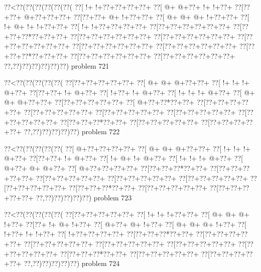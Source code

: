 \vbox{\vbox{\goo
\0??<\0??(\0??(\0??(\0??(\0??(\0??(
\0??[\- !+\- !+\0??+\0??+\0??+\0??+
\0??[\- @+\- @+\0??+\- !+\- !+\0??+
\0??[\0??+\0??+\- @+\0??+\0??+\0??+
\0??[\0??+\0??+\- @+\- !+\0??+\0??+
\0??[\- @+\- @+\- @+\- !+\0??+\0??+
\0??[\- !+\- @+\- !+\- !+\0??+\0??+
\0??[\- !+\- !+\0??+\0??+\0??+\0??+
\0??[\0??+\0??+\0??+\0??+\0??+\0??+
\0??[\0??+\0??+\0??*\0??+\0??+\0??+
\0??[\0??+\0??+\0??+\0??+\0??+\0??+
\0??[\0??+\0??+\0??+\0??+\0??+\0??+
\0??[\0??+\0??+\0??+\0??+\0??+\0??+
\0??[\0??+\0??+\0??+\0??+\0??+\0??+
\0??[\0??+\0??+\0??+\0??+\0??+\0??+
\0??[\0??+\0??+\0??*\0??+\0??+\0??+
\0??[\0??+\0??+\0??+\0??+\0??+\0??+
\0??[\0??+\0??+\0??+\0??+\0??+\0??+
\0??,\0??)\0??)\0??)\0??)\0??)\0??)
}
\hfil problem 721\hfil\break
}

\vbox{\vbox{\goo
\0??<\0??(\0??(\0??(\0??(\0??(
\0??[\0??+\0??+\0??+\0??+\0??+
\0??[\- @+\- @+\- @+\0??+\0??+
\0??[\- !+\- !+\- !+\- @+\0??+
\0??[\0??+\0??+\- !+\- @+\0??+
\0??[\- !+\0??+\- !+\- @+\0??+
\0??[\- !+\- !+\- !+\- @+\0??+
\0??[\- @+\- @+\- @+\0??+\0??+
\0??[\0??+\0??+\0??+\0??+\0??+
\0??[\- @+\0??+\0??*\0??+\0??+
\0??[\0??+\0??+\0??+\0??+\0??+
\0??[\0??+\0??+\0??+\0??+\0??+
\0??[\0??+\0??+\0??+\0??+\0??+
\0??[\0??+\0??+\0??+\0??+\0??+
\0??[\0??+\0??+\0??+\0??+\0??+
\0??[\0??+\0??+\0??*\0??+\0??+
\0??[\0??+\0??+\0??+\0??+\0??+
\0??[\0??+\0??+\0??+\0??+\0??+
\0??,\0??)\0??)\0??)\0??)\0??)
}
\hfil problem 722\hfil\break
}

\vbox{\vbox{\goo
\0??<\0??(\0??(\0??(\0??(\0??(
\0??[\- @+\0??+\0??+\0??+\0??+
\0??[\- @+\- @+\- @+\0??+\0??+
\0??[\- !+\- !+\- !+\- @+\0??+
\0??[\0??+\0??+\- !+\- @+\0??+
\0??[\- !+\- @+\- !+\- @+\0??+
\0??[\- !+\- !+\- !+\- @+\0??+
\0??[\- @+\0??+\- @+\- @+\0??+
\0??[\- @+\0??+\0??+\0??+\0??+
\0??[\0??+\0??+\0??*\0??+\0??+
\0??[\0??+\0??+\0??+\0??+\0??+
\0??[\0??+\0??+\0??+\0??+\0??+
\0??[\0??+\0??+\0??+\0??+\0??+
\0??[\0??+\0??+\0??+\0??+\0??+
\0??[\0??+\0??+\0??+\0??+\0??+
\0??[\0??+\0??+\0??*\0??+\0??+
\0??[\0??+\0??+\0??+\0??+\0??+
\0??[\0??+\0??+\0??+\0??+\0??+
\0??,\0??)\0??)\0??)\0??)\0??)
}
\hfil problem 723\hfil\break
}

\vbox{\vbox{\goo
\0??<\0??(\0??(\0??(\0??(\0??(
\0??[\0??+\0??+\0??+\0??+\0??+
\0??[\- !+\- !+\- !+\0??+\0??+
\0??[\- @+\- @+\- @+\- !+\0??+
\0??[\0??+\- !+\- @+\- !+\0??+
\0??[\- @+\0??+\- @+\- !+\0??+
\0??[\- @+\- @+\- @+\- !+\0??+
\0??[\- !+\0??+\- !+\- !+\0??+
\0??[\- !+\0??+\0??+\0??+\0??+
\0??[\0??+\0??+\0??*\0??+\0??+
\0??[\0??+\0??+\0??+\0??+\0??+
\0??[\0??+\0??+\0??+\0??+\0??+
\0??[\0??+\0??+\0??+\0??+\0??+
\0??[\0??+\0??+\0??+\0??+\0??+
\0??[\0??+\0??+\0??+\0??+\0??+
\0??[\0??+\0??+\0??*\0??+\0??+
\0??[\0??+\0??+\0??+\0??+\0??+
\0??[\0??+\0??+\0??+\0??+\0??+
\0??,\0??)\0??)\0??)\0??)\0??)
}
\hfil problem 724\hfil\break
}

